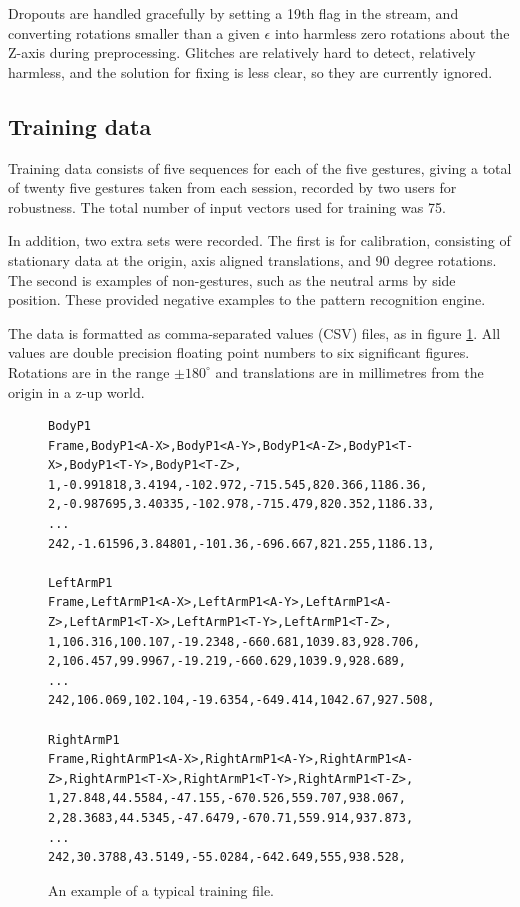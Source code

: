 \documentclass[12pt,a4,notitlepage]{report}
\renewcommand{\_}{\texttt{\symbol{95}}}
\newcommand{\<}{\texttt{\symbol{60}}}
\renewcommand{\>}{\texttt{\symbol{62}}}
\begin{document}
Dropouts are handled gracefully by setting a 19th flag in the stream, and converting rotations smaller than a given $\epsilon$ into harmless zero rotations about the Z-axis during preprocessing. Glitches are relatively hard to detect, relatively harmless, and the solution for fixing is less clear, so they are currently ignored.

\subsection{Training data}

Training data consists of five sequences for each of the five gestures, giving a total of twenty five gestures taken from each session, recorded by two users for robustness. The total number of input vectors used for training was 75.

In addition, two extra sets were recorded. The first is for calibration, consisting of stationary data at the origin, axis aligned translations, and 90 degree rotations. The second is examples of non-gestures, such as the neutral arms by side position. These provided negative examples to the pattern recognition engine.

The data is formatted as comma-separated values (CSV) files, as in figure \ref{trainingfile}. All values are double precision floating point numbers to six significant figures. Rotations are in the range $ \pm 180^{\circ}$ and translations are in millimetres from the origin in a z-up world.

\begin{figure}
\centering
{\scriptsize
\begin{verbatim}
BodyP1
Frame,BodyP1<A-X>,BodyP1<A-Y>,BodyP1<A-Z>,BodyP1<T-X>,BodyP1<T-Y>,BodyP1<T-Z>,
1,-0.991818,3.4194,-102.972,-715.545,820.366,1186.36,
2,-0.987695,3.40335,-102.978,-715.479,820.352,1186.33,
...
242,-1.61596,3.84801,-101.36,-696.667,821.255,1186.13,

LeftArmP1
Frame,LeftArmP1<A-X>,LeftArmP1<A-Y>,LeftArmP1<A-Z>,LeftArmP1<T-X>,LeftArmP1<T-Y>,LeftArmP1<T-Z>,
1,106.316,100.107,-19.2348,-660.681,1039.83,928.706,
2,106.457,99.9967,-19.219,-660.629,1039.9,928.689,
...
242,106.069,102.104,-19.6354,-649.414,1042.67,927.508,

RightArmP1
Frame,RightArmP1<A-X>,RightArmP1<A-Y>,RightArmP1<A-Z>,RightArmP1<T-X>,RightArmP1<T-Y>,RightArmP1<T-Z>,
1,27.848,44.5584,-47.155,-670.526,559.707,938.067,
2,28.3683,44.5345,-47.6479,-670.71,559.914,937.873,
...
242,30.3788,43.5149,-55.0284,-642.649,555,938.528,
\end{verbatim}
}
\caption{An example of a typical training file.}
\label{trainingfile}
\end{figure}
\end{document}
